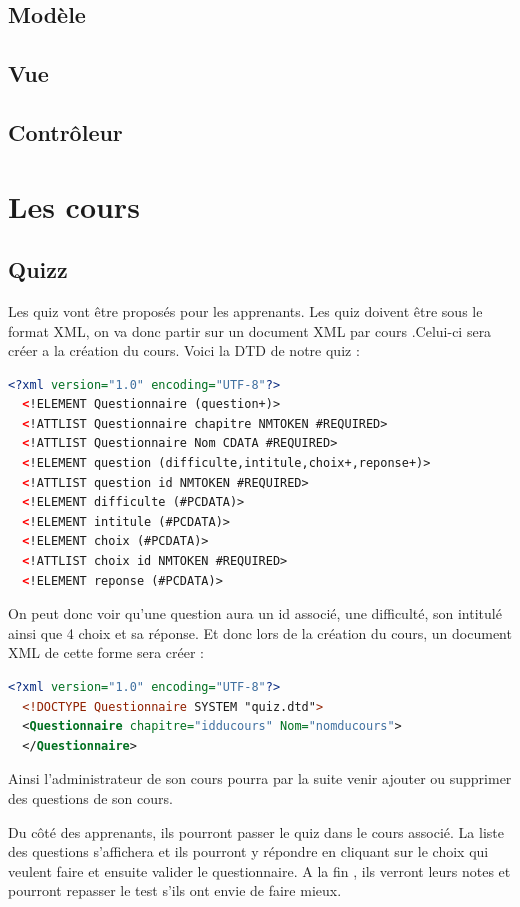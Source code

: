\documentclass[a4paper,10pt]{article}
\begin{document}
\subsection{Modèle}
\subsection{Vue}
\subsection{Contrôleur}

\section{Les cours}
\subsection{Quizz}
Les quiz vont être proposés pour les apprenants. Les quiz doivent être sous le format XML, on va donc partir sur un document XML par cours .Celui-ci sera créer a la création du cours.
Voici la DTD de notre quiz : 
\begin{lstlisting}[language=XML]
  <?xml version="1.0" encoding="UTF-8"?>
  <!ELEMENT Questionnaire (question+)>
  <!ATTLIST Questionnaire chapitre NMTOKEN #REQUIRED>
  <!ATTLIST Questionnaire Nom CDATA #REQUIRED>
  <!ELEMENT question (difficulte,intitule,choix+,reponse+)>
  <!ATTLIST question id NMTOKEN #REQUIRED>
  <!ELEMENT difficulte (#PCDATA)>
  <!ELEMENT intitule (#PCDATA)>
  <!ELEMENT choix (#PCDATA)>
  <!ATTLIST choix id NMTOKEN #REQUIRED>
  <!ELEMENT reponse (#PCDATA)>
\end{lstlisting}
On peut donc voir qu'une question aura un id associé, une difficulté, son intitulé ainsi que 4 choix et sa réponse.
Et donc lors de la création du cours, un document XML de cette forme sera créer : 
\begin{lstlisting}[language=XML]
  <?xml version="1.0" encoding="UTF-8"?>
  <!DOCTYPE Questionnaire SYSTEM "quiz.dtd">
  <Questionnaire chapitre="idducours" Nom="nomducours"> 
  </Questionnaire>
\end{lstlisting} 

Ainsi l'administrateur de son cours pourra par la suite venir ajouter ou supprimer des questions de son cours. 

Du côté des apprenants, ils pourront passer le quiz dans le cours associé. La liste des questions s'affichera et ils pourront y répondre en cliquant sur le choix qui veulent faire et ensuite valider le questionnaire.
A la fin , ils verront leurs notes et pourront repasser le test s'ils ont envie de faire mieux.
\end{document}
